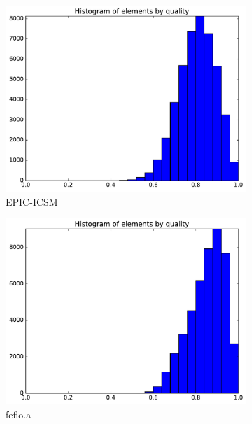 \documentclass[3p,times,procedia,number]{elsarticle}
\begin{document}
\begin{figure}
\begin{subfigure}{.24\textwidth}
\includegraphics[width=\textwidth]{epic-icsm-cube-linear-quality.pdf}
\caption{EPIC-ICSM}
\end{subfigure}
\begin{subfigure}{.24\textwidth}
\centering
\includegraphics[width=\textwidth]{fefloa-cube-linear-quality.pdf}
\caption{feflo.a}
\end{subfigure}
\begin{subfigure}{.24\textwidth}
\centering

\end{subfigure}
\end{figure}
\end{document}
